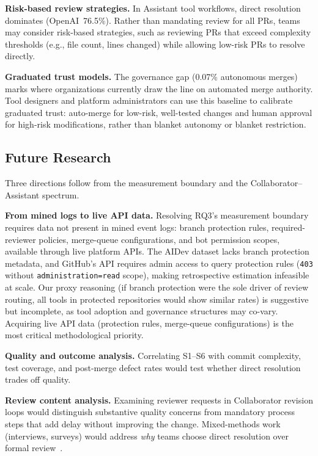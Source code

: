 \documentclass[sigconf]{acmart}
\begin{document}
\textbf{Risk-based review strategies.}
In Assistant tool workflows, direct resolution dominates
(OpenAI~76.5\%).
Rather than mandating review for all PRs, teams may consider
risk-based strategies, such as reviewing PRs that exceed complexity
thresholds (e.g., file count, lines changed) while allowing
low-risk PRs to resolve directly.

\textbf{Graduated trust models.}
The governance gap (0.07\% autonomous merges) marks where
organizations currently draw the line on automated merge authority.
Tool designers and platform administrators can use this baseline
to calibrate graduated trust: auto-merge for low-risk,
well-tested changes and human approval for high-risk
modifications, rather than blanket autonomy or blanket
restriction.

\subsection{Future Research}

Three directions follow from the measurement boundary and the
Collaborator--Assistant spectrum.

\textbf{From mined logs to live API data.}
Resolving RQ3's measurement boundary requires data not present
in mined event logs: branch protection rules, required-reviewer
policies, merge-queue configurations, and bot permission scopes,
available through live platform APIs.
The AIDev dataset lacks branch protection metadata, and GitHub's
API requires admin access to query protection rules
(\texttt{403} without \texttt{administration=read} scope),
making retrospective estimation infeasible at scale.
Our proxy reasoning (if branch protection were the sole driver
of review routing, all tools in protected repositories would
show similar rates) is suggestive but incomplete, as tool
adoption and governance structures may co-vary.
Acquiring live API data (protection rules, merge-queue
configurations) is the most critical methodological priority.

\textbf{Quality and outcome analysis.}
Correlating S1--S6 with commit complexity, test coverage, and
post-merge defect rates would test whether direct resolution
trades off quality.

\textbf{Review content analysis.}
Examining reviewer requests in Collaborator revision loops
would distinguish substantive quality concerns from
mandatory process steps that add delay without improving the change.
Mixed-methods work (interviews, surveys) would address
\emph{why} teams choose direct resolution over formal
review~\cite{okamura2020trust,glikson2020trust}.
\end{document}
